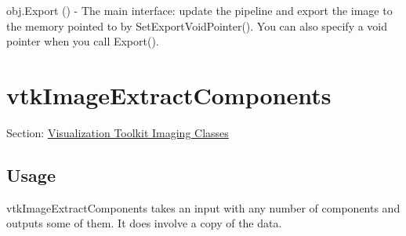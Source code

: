 \begin{DoxyItemize}
\item {\ttfamily obj.\-Export ()} -\/ The main interface\-: update the pipeline and export the image to the memory pointed to by Set\-Export\-Void\-Pointer(). You can also specify a void pointer when you call Export().  
\end{DoxyItemize}\hypertarget{vtkimaging_vtkimageextractcomponents}{}\section{vtk\-Image\-Extract\-Components}\label{vtkimaging_vtkimageextractcomponents}
Section\-: \hyperlink{sec_vtkimaging}{Visualization Toolkit Imaging Classes} \hypertarget{vtkwidgets_vtkxyplotwidget_Usage}{}\subsection{Usage}\label{vtkwidgets_vtkxyplotwidget_Usage}
vtk\-Image\-Extract\-Components takes an input with any number of components and outputs some of them. It does involve a copy of the data.

